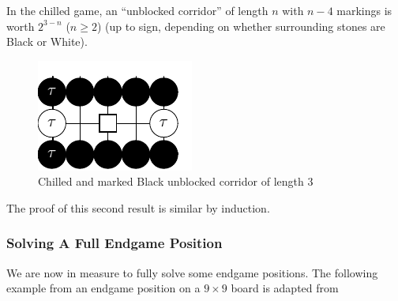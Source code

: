 \documentclass[../math194_paper.tex]{subfiles}
\begin{document}
\begin{theorem}
    \label{unblocked_corridor}
    In the chilled game, an ``unblocked corridor'' of length $n$ with $n-4$ markings is worth $2^{3-n}$ ($n\geq2$)
    (up to sign, depending on whether surrounding stones are Black or White).
\end{theorem}

\begin{figure}[H]
    \centering
    \includegraphics{figures/unblocked_corridor.pdf}
    \caption*{Chilled and marked Black unblocked corridor of length 3}
\end{figure}
The proof of this second result is similar by induction.

\subsubsection{Solving A Full Endgame Position}
\label{endgame_position}

We are now in measure to fully solve some endgame positions. The following 
example from an endgame position on a $9\times9$ board 
is adapted from \cite[\S 2]{berlekamp1994mathematical}
\end{document}
